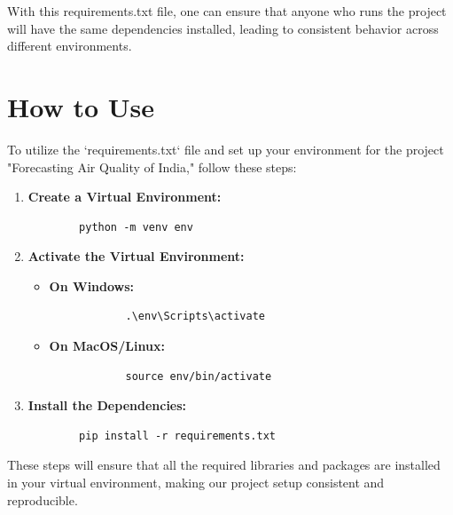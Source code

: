 With this requirements.txt file, one can ensure that anyone who runs the project will have the same dependencies installed, leading to consistent behavior across different environments.

\section{How to Use}

To utilize the `requirements.txt` file and set up your environment for the project "Forecasting Air Quality of India," follow these steps:

\begin{enumerate}
	\item \textbf{Create a Virtual Environment:} 
	\begin{verbatim}
		python -m venv env
	\end{verbatim}
	\item \textbf{Activate the Virtual Environment:} 
	\begin{itemize}
		\item \textbf{On Windows:}
		\begin{verbatim}
			.\env\Scripts\activate
		\end{verbatim}
		\item \textbf{On MacOS/Linux:}
		\begin{verbatim}
			source env/bin/activate
		\end{verbatim}
	\end{itemize}
	\item \textbf{Install the Dependencies:} 
	\begin{verbatim}
		pip install -r requirements.txt
	\end{verbatim}
\end{enumerate}

These steps will ensure that all the required libraries and packages are installed in your virtual environment, making our project setup consistent and reproducible.
